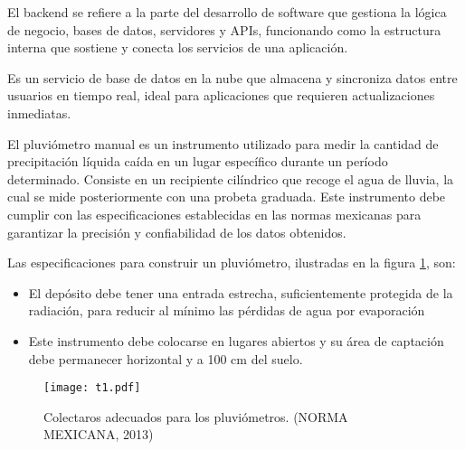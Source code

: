 \begin{definition}[Backend]
El backend se refiere a la parte del desarrollo de software que gestiona la lógica de negocio, bases de datos, servidores y APIs, funcionando como la estructura interna que sostiene y conecta los servicios de una aplicación.
\end{definition}






\begin{definition}
Es un servicio de base de datos en la nube que almacena y sincroniza datos entre usuarios en tiempo real, ideal para aplicaciones que requieren actualizaciones inmediatas.
\end{definition}
















\begin{definition}

El pluviómetro manual es un instrumento utilizado para medir la cantidad de precipitación líquida caída en un lugar específico durante un período determinado. Consiste en un recipiente cilíndrico que recoge el agua de lluvia, la cual se mide posteriormente con una probeta graduada. Este instrumento debe cumplir con las especificaciones establecidas en las normas mexicanas para garantizar la precisión y confiabilidad de los datos obtenidos.\cite{semarnat_pluviometro}
\end{definition}

Las especificaciones para construir un pluviómetro, ilustradas en la figura \ref{t1}, son:
\begin{itemize}
    \item El depósito debe tener una entrada estrecha, suficientemente protegida de la radiación, para reducir al mínimo las pérdidas de agua por evaporación
    \item Este instrumento debe colocarse en lugares abiertos y su área de captación debe permanecer horizontal y a 100 cm del suelo. \cite{se2013}
\end{itemize}

\begin{figure}[ht]
\centering
  \texttt{[image: t1.pdf]}
  \caption{Colectaros adecuados para los pluviómetros. (NORMA MEXICANA, 2013)}
  \label{t1}
\end{figure}

















